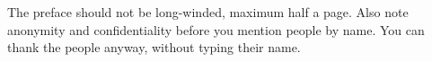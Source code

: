 \documentclass[a4paper, 12pt, titlepage, abstract, numbers=enddot]{scrreprt}
\begin{document}
The preface should not be long-winded, maximum half a page. Also note anonymity and confidentiality before you mention people by name. You can thank the people anyway, without typing their name.
\tableofcontents
\listoffigures
\newpage
{} %









\printbibliography

\clearpage
\setcounter{page}{1} %

\end{document}
